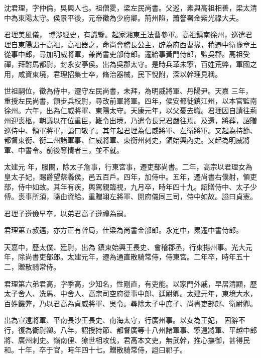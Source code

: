 
\begin{pinyinscope}

 沈君理，字仲倫，吳興人也。祖僧畟，梁左民尚書。父巡，素與高祖相善，梁太清中為東陽太守。侯景平後，元帝徵為少府卿。荊州陷，蕭詧署金紫光祿大夫。



 君理美風儀，
 博涉經史，有識鑒。起家湘東王法曹參軍。高祖鎮南徐州，巡遣君理自東陽謁于高祖，高祖器之，命尚會稽長公主，辟為府西曹掾，稍遷中衛豫章王從事中郎，尋加明威將軍，兼尚書吏部侍郎。遷給事黃門侍郎，監吳郡。高祖受禪，拜駙馬都尉，封永安亭侯。出為吳郡太守。是時兵革未寧，百姓荒弊，軍國之用，咸資東境，君理招集士卒，脩治器械，民下悅附，深以幹理見稱。



 世祖嗣位，徵為侍中，遷守左民尚書，未拜，為明威將軍、丹陽尹。天嘉
 三年，重授左民尚書，領步兵校尉，尋改前軍將軍。四年，侯安都徙鎮江州，以本官監南徐州。六年，出為仁威將軍、東陽太守。天康元年，以父憂去職。君理因自請往荊州迎喪柩，朝議以在位重臣，難令出境，乃遣令長兄君嚴往焉。及還，將葬，詔贈巡侍中、領軍將軍，謚曰敬子。其年起君理為信威將軍、左衛將軍。又起為持節、都督東衡、衡二州諸軍事、仁威將軍、東衡州刺史，領始興內史。又起為明威將軍、中書令。前後奪情者三，並不就。



 太建元
 年，服闋，除太子詹事，行東宮事，遷吏部尚書。二年，高宗以君理女為皇太子妃，賜爵望蔡縣侯，邑五百戶。四年，加侍中。五年，遷尚書右僕射，領吏部，侍中如故。其年有疾，輿駕親臨視，九月卒，時年四十九。詔贈侍中、太子少傅。喪事所須，隨由資給。重贈翊左將軍、開府儀同三司，侍中如故。謚曰貞憲。



 君理子遵儉早卒，以弟君高子遵禮為嗣。



 君理第五叔邁，亦方正有幹局，仕梁為尚書金部郎。永定中，累遷中書侍郎。



 天嘉中，歷太僕、廷尉，出為
 鎮東始興王長史、會稽郡丞，行東揚州事。光大元年，除尚書吏部郎。太建元年，遷為通直散騎常侍，侍東宮。二年卒，時年五十二，贈散騎常侍。



 君理第六弟君高，字季高，少知名，性剛直，有吏能。以家門外戚，早居清顯，歷太子舍人、洗馬、中舍人、高宗司空府從事中郎、廷尉卿。太建元年，東境大水，百姓饑弊，乃以君高為貞威將軍、吳令。尋除太子中庶子、尚書吏部郎、衛尉卿。



 出為宣遠將軍、平南長沙王長史、南海太守，行廣州事。以女為王妃，
 固辭不行，復為衛尉卿。八年，詔授持節、都督廣等十八州諸軍事、寧遠將軍、平越中郎將、廣州刺史。嶺南俚、獠世相攻伐，君高本文吏，無武幹，推心撫御，甚得民和。十年，卒于官，時年四十七。贈散騎常侍，謚曰祁子。




\end{pinyinscope}
